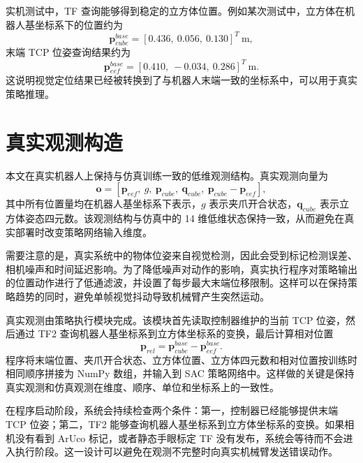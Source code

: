 \documentclass[
    type = bachelor,
    oneside,
    fontset = fandol
]{njuthesis}
\begin{document}
实机测试中，TF 查询能够得到稳定的立方体位置。例如某次测试中，立方体在机器人基坐标系下的位置约为
\begin{equation}
  \boldsymbol{p}_{cube}^{base}=[0.436,\ 0.056,\ 0.130]^T \ \mathrm{m},
\end{equation}
末端 TCP 位姿查询结果约为
\begin{equation}
  \boldsymbol{p}_{eef}^{base}=[0.410,\ -0.034,\ 0.286]^T \ \mathrm{m}.
\end{equation}
这说明视觉定位结果已经被转换到了与机器人末端一致的坐标系中，可以用于真实策略推理。


\section{真实观测构造}

本文在真实机器人上保持与仿真训练一致的低维观测结构。真实观测向量为
\begin{equation}
  \boldsymbol{o} =
  [\boldsymbol{p}_{eef},\ g,\ \boldsymbol{p}_{cube},\
  \boldsymbol{q}_{cube},\ \boldsymbol{p}_{cube}-\boldsymbol{p}_{eef}],
\end{equation}
其中所有位置量均在机器人基坐标系下表示，$g$ 表示夹爪开合状态，$\boldsymbol{q}_{cube}$ 表示立方体姿态四元数。该观测结构与仿真中的 14 维低维状态保持一致，从而避免在真实部署时改变策略网络输入维度。

需要注意的是，真实系统中的物体位姿来自视觉检测，因此会受到标记检测误差、相机噪声和时间延迟影响。为了降低噪声对动作的影响，真实执行程序对策略输出的位置动作进行了低通滤波，并设置了每步最大末端位移限制。这样可以在保持策略趋势的同时，避免单帧视觉抖动导致机械臂产生突然运动。

真实观测由策略执行模块完成。该模块首先读取控制器维护的当前 TCP 位姿，然后通过 TF2 查询机器人基坐标系到立方体坐标系的变换，最后计算相对位置
\begin{equation}
  \boldsymbol{p}_{rel}
  =
  \boldsymbol{p}_{cube}^{base}
  -
  \boldsymbol{p}_{eef}^{base}.
\end{equation}
程序将末端位置、夹爪开合状态、立方体位置、立方体四元数和相对位置按训练时相同顺序拼接为 NumPy 数组，并输入到 SAC 策略网络中。这样做的关键是保持真实观测和仿真观测在维度、顺序、单位和坐标系上的一致性。

在程序启动阶段，系统会持续检查两个条件：第一，控制器已经能够提供末端 TCP 位姿；第二，TF2 能够查询机器人基坐标系到立方体坐标系的变换。如果相机没有看到 ArUco 标记，或者静态手眼标定 TF 没有发布，系统会等待而不会进入执行阶段。这一设计可以避免在观测不完整时向真实机械臂发送错误动作。
\end{document}

